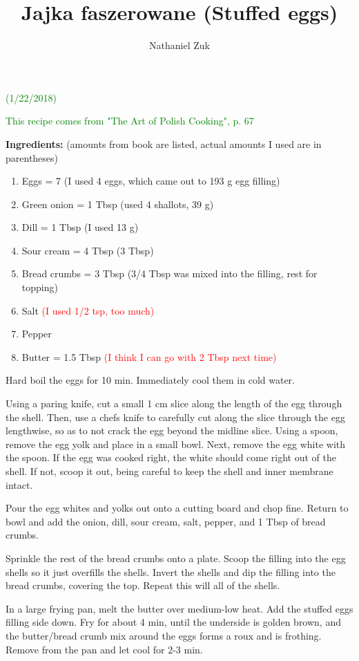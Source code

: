 \documentclass[11pt]{article}
\title{Jajka faszerowane (Stuffed eggs)}
\author{Nathaniel Zuk}
\begin{document}
\maketitle

\textcolor{green}{(1/22/2018)}

\textcolor{green}{This recipe comes from "The Art of Polish Cooking", p. 67}

\textbf{Ingredients:} (amounts from book are listed, actual amounts I used are in parentheses)

\begin{enumerate}
\item Eggs = 7 (I used 4 eggs, which came out to 193 g egg filling)
\item Green onion = 1 Tbsp (used 4 shallots, 39 g)
\item Dill = 1 Tbsp (I used 13 g)
\item Sour cream = 4 Tbsp (3 Tbsp)
\item Bread crumbs = 3 Tbsp (3/4 Tbsp was mixed into the filling, rest for topping)
\item Salt \textcolor{red}{(I used 1/2 tsp, too much)}
\item Pepper
\item Butter = 1.5 Tbsp \textcolor{red}{(I think I can go with 2 Tbsp next time)}
\end{enumerate}

Hard boil the eggs for 10 min.  Immediately cool them in cold water.

Using a paring knife, cut a small 1 cm slice along the length of the egg through the shell.  Then, use a chefs knife to carefully cut along the slice through the egg lengthwise, so as to not crack the egg beyond the midline slice.  Using a spoon, remove the egg yolk and place in a small bowl.  Next, remove the egg white with the spoon.  If the egg was cooked right, the white should come right out of the shell.  If not, scoop it out, being careful to keep the shell and inner membrane intact.

Pour the egg whites and yolks out onto a cutting board and chop fine.  Return to bowl and add the onion, dill, sour cream, salt, pepper, and 1 Tbsp of bread crumbs.

Sprinkle the rest of the bread crumbs onto a plate.  Scoop the filling into the egg shells so it just overfills the shells.  Invert the shells and dip the filling into the bread crumbs, covering the top.  Repeat this will all of the shells.

In a large frying pan, melt the butter over medium-low heat.  Add the stuffed eggs filling side down.  Fry for about 4 min, until the underside is golden brown, and the butter/bread crumb mix around the eggs forms a roux and is frothing.  Remove from the pan and let cool for 2-3 min.
\end{document}
